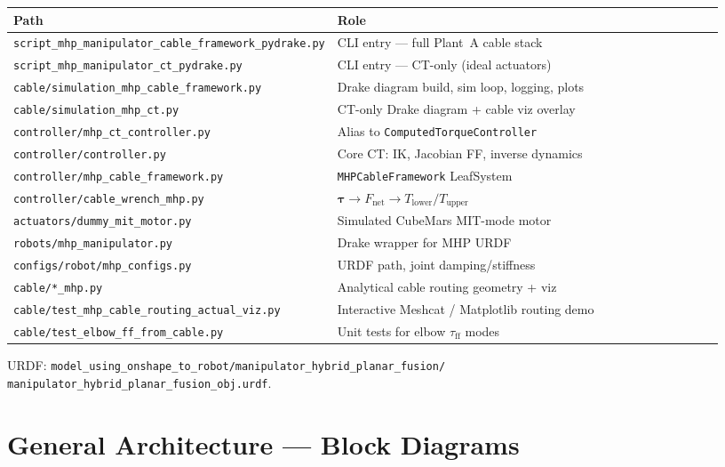 \documentclass[11pt,a4paper]{article}
\newcommand{\btau}{\bm{\tau}}
\begin{document}
\begin{longtable}{@{}p{0.38\linewidth}p{0.55\linewidth}@{}}
\toprule
\textbf{Path} & \textbf{Role} \\
\midrule
\endhead
\texttt{script\_mhp\_manipulator\_cable\_framework\_pydrake.py}
  & CLI entry --- full Plant~A cable stack \\
\texttt{script\_mhp\_manipulator\_ct\_pydrake.py}
  & CLI entry --- CT-only (ideal actuators) \\
\texttt{cable/simulation\_mhp\_cable\_framework.py}
  & Drake diagram build, sim loop, logging, plots \\
\texttt{cable/simulation\_mhp\_ct.py}
  & CT-only Drake diagram + cable viz overlay \\
\texttt{controller/mhp\_ct\_controller.py}
  & Alias to \texttt{ComputedTorqueController} \\
\texttt{controller/controller.py}
  & Core CT: IK, Jacobian FF, inverse dynamics \\
\texttt{controller/mhp\_cable\_framework.py}
  & \texttt{MHPCableFramework} LeafSystem \\
\texttt{controller/cable\_wrench\_mhp.py}
  & $\btau \to F_{\mathrm{net}} \to T_{\mathrm{lower}}/T_{\mathrm{upper}}$ \\
\texttt{actuators/dummy\_mit\_motor.py}
  & Simulated CubeMars MIT-mode motor \\
\texttt{robots/mhp\_manipulator.py}
  & Drake wrapper for MHP URDF \\
\texttt{configs/robot/mhp\_configs.py}
  & URDF path, joint damping/stiffness \\
\texttt{cable/*\_mhp.py}
  & Analytical cable routing geometry + viz \\
\texttt{cable/test\_mhp\_cable\_routing\_actual\_viz.py}
  & Interactive Meshcat / Matplotlib routing demo \\
\texttt{cable/test\_elbow\_ff\_from\_cable.py}
  & Unit tests for elbow $\tau_{\mathrm{ff}}$ modes \\
\bottomrule
\end{longtable}

URDF:
\texttt{model\_using\_onshape\_to\_robot/manipulator\_hybrid\_planar\_fusion/\\
manipulator\_hybrid\_planar\_fusion\_obj.urdf}.

\section{General Architecture --- Block Diagrams}
\end{document}
